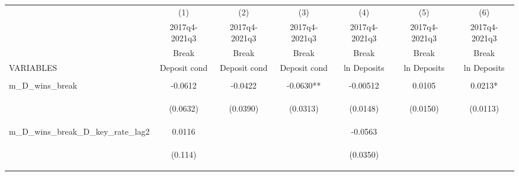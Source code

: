 



\begin{tabular}{lcccccc} \hline
 & (1) & (2) & (3) & (4) & (5) & (6) \\
 & 2017q4-2021q3 & 2017q4-2021q3 & 2017q4-2021q3 & 2017q4-2021q3 & 2017q4-2021q3 & 2017q4-2021q3 \\
 & Break & Break & Break & Break & Break & Break \\
VARIABLES & Deposit cond & Deposit cond & Deposit cond & ln Deposits & ln Deposits & ln Deposits \\ \hline
\vspace{4pt} & \begin{footnotesize}\end{footnotesize} & \begin{footnotesize}\end{footnotesize} & \begin{footnotesize}\end{footnotesize} & \begin{footnotesize}\end{footnotesize} & \begin{footnotesize}\end{footnotesize} & \begin{footnotesize}\end{footnotesize} \\
m\_D\_wins\_break & -0.0612 & -0.0422 & -0.0630** & -0.00512 & 0.0105 & 0.0213* \\
\vspace{4pt} & \begin{footnotesize}(0.0632)\end{footnotesize} & \begin{footnotesize}(0.0390)\end{footnotesize} & \begin{footnotesize}(0.0313)\end{footnotesize} & \begin{footnotesize}(0.0148)\end{footnotesize} & \begin{footnotesize}(0.0150)\end{footnotesize} & \begin{footnotesize}(0.0113)\end{footnotesize} \\
m\_D\_wins\_break\_D\_key\_rate\_lag2 & 0.0116 &  &  & -0.0563 &  &  \\
\vspace{4pt} & \begin{footnotesize}(0.114)\end{footnotesize} & \begin{footnotesize}\end{footnotesize} & \begin{footnotesize}\end{footnotesize} & \begin{footnotesize}(0.0350)\end{footnotesize} & \begin{footnotesize}\end{footnotesize} & \begin{footnotesize}\end{footnotesize} \\

\end{tabular}
